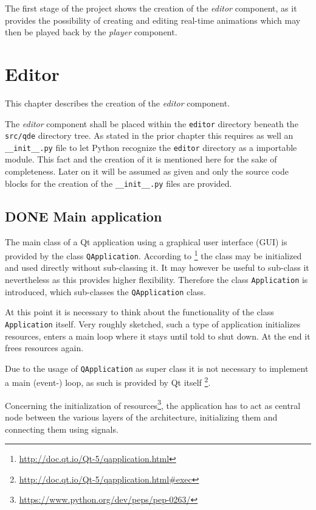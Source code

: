 \documentclass[10pt, openright, notitlepage]{scrreprt}
\begin{document}
The first stage of the project shows the creation of the \emph{editor} component, as
it provides the possibility of creating and editing real-time animations which
may then be played back by the \emph{player} component\cite[p. 29]{osterwalder_qde_2016}.
\section{Editor}
\label{sec:org73dec93}
This chapter describes the creation of the \emph{editor} component.

The \emph{editor} component shall be placed within the \texttt{editor} directory beneath the
\texttt{src/qde} directory tree. As stated in the prior chapter this requires as well
an \texttt{\_\_init\_\_.py} file to let Python recognize the \texttt{editor} directory as a
importable module. This fact and the creation of it is mentioned here for the
sake of completeness. Later on it will be assumed as given and only the source
code blocks for the creation of the \texttt{\_\_init\_\_.py} files are provided.
\subsection{{\bfseries\sffamily DONE} Main application}
\label{sec:org402e799}
The main class of a Qt application using a graphical user interface (GUI)
is provided by the class \texttt{QApplication}. According to
\footnote{\url{http://doc.qt.io/Qt-5/qapplication.html}} the class may be initialized and
used directly without sub-classing it. It may however be useful to sub-class it
nevertheless as this provides higher flexibility. Therefore the class
\texttt{Application} is introduced, which sub-classes the \texttt{QApplication} class.

At this point it is necessary to think about the functionality of the class
\texttt{Application} itself. Very roughly sketched, such a type of application
initializes resources, enters a main loop where it stays until told to shut
down. At the end it frees resources again.

Due to the usage of \texttt{QApplication} as super class it is not necessary to
implement a main (event-) loop, as such is provided by Qt itself
\footnote{\url{http://doc.qt.io/Qt-5/qapplication.html\#exec}}.

Concerning the initialization of
resources\footnote{\url{https://www.python.org/dev/peps/pep-0263/}}, the application has
to act as central node between the various layers of the architecture,
initializing them and connecting them using signals.\cite[S. 37 bis 38]{osterwalder_qde_2016}
\end{document}
